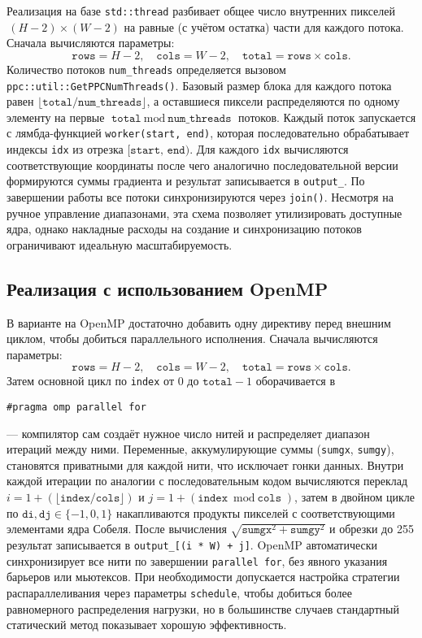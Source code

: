 \documentclass[12pt]{article}
\begin{document}
Реализация на базе \texttt{std::thread} разбивает общее число внутренних пикселей \(\,(H-2)\times(W-2)\) на равные (с учётом остатка) части для каждого потока. Сначала вычисляются параметры:
\[
    \texttt{rows} = H - 2,\quad \texttt{cols} = W - 2,\quad \texttt{total} = \texttt{rows} \times \texttt{cols}.
\]
Количество потоков \texttt{num\_threads} определяется вызовом \lstinline[breaklines]{ppc::util::GetPPCNumThreads()}. Базовый размер блока для каждого потока равен $\lfloor \texttt{total}/\texttt{num\_threads}\rfloor$, а оставшиеся пиксели распределяются по одному элементу на первые $\texttt{total} \bmod \texttt{num\_threads}$ потоков. Каждый поток запускается с лямбда-функцией \texttt{worker(start, end)}, которая последовательно обрабатывает индексы \texttt{idx} из отрезка \([\texttt{start},\,\texttt{end})\). Для каждого \texttt{idx} вычисляются соответствующие координаты после чего аналогично последовательной версии формируются суммы градиента и результат записывается в \texttt{output\_}. По завершении работы все потоки синхронизируются через \texttt{join()}. Несмотря на ручное управление диапазонами, эта схема позволяет утилизировать доступные ядра, однако накладные расходы на создание и синхронизацию потоков ограничивают идеальную масштабируемость.

\subsection{Реализация с использованием OpenMP}

В варианте на OpenMP достаточно добавить одну директиву перед внешним циклом, чтобы добиться параллельного исполнения. Сначала вычисляются параметры:
\[
    \texttt{rows} = H - 2,\quad \texttt{cols} = W - 2,\quad \texttt{total} = \texttt{rows} \times \texttt{cols}.
\]
Затем основной цикл по \texttt{index} от 0 до \(\texttt{total}-1\) оборачивается в
\begin{verbatim}
#pragma omp parallel for
\end{verbatim}
— компилятор сам создаёт нужное число нитей и распределяет диапазон итераций между ними. Переменные, аккумулирующие суммы (\texttt{sumgx}, \texttt{sumgy}), становятся приватными для каждой нити, что исключает гонки данных. Внутри каждой итерации по аналогии с последовательным кодом вычисляются переклад $i = 1 + (\lfloor \texttt{index}/\texttt{cols}\rfloor)$ и $j = 1 + (\texttt{index} \bmod \texttt{cols})$, затем в двойном цикле по \(\texttt{di}, \texttt{dj} \in \{-1,0,1\}\) накапливаются продукты пикселей с соответствующими элементами ядра Собеля. После вычисления $\sqrt{\texttt{sumgx}^2 + \texttt{sumgy}^2}$ и обрезки до 255 результат записывается в \texttt{output\_[(i * W) + j]}. OpenMP автоматически синхронизирует все нити по завершении \verb|parallel for|, без явного указания барьеров или мьютексов. При необходимости допускается настройка стратегии распараллеливания через параметры \verb|schedule|, чтобы добиться более равномерного распределения нагрузки, но в большинстве случаев стандартный статический метод показывает хорошую эффективность.
\end{document}
